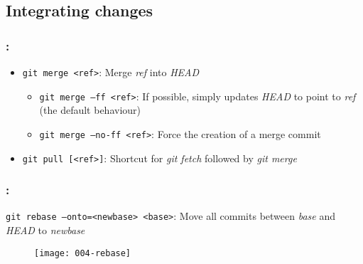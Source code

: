 \subsection{Integrating changes}

\begin{frame}
    \frametitle{\secname: \small\subsecname\normalsize}

    \begin{itemize}
        \item \texttt{git merge <ref>}: Merge \textit{ref} into \textit{HEAD}
        \begin{itemize}
            \item \texttt{git merge --ff <ref>}: If possible, simply updates \textit{HEAD} to point to \textit{ref} (the default behaviour)
            \item \texttt{git merge --no-ff <ref>}: Force the creation of a merge commit
        \end{itemize}
        \item \texttt{git pull [<ref>]}: Shortcut for \textit{git fetch} followed by \textit{git merge}
    \end{itemize}
\end{frame}

\begin{frame}
    \frametitle{\secname: \small\subsecname\normalsize}

    \texttt{git rebase --onto=<newbase> <base>}: Move all commits between \textit{base} and \textit{HEAD} to \textit{newbase}

    \begin{figure}[h]
        \texttt{[image: 004-rebase]}
        \centering
    \end{figure}
\end{frame}

